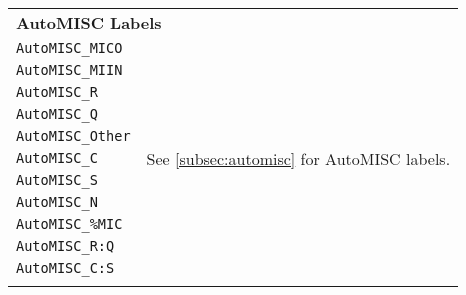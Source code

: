 \begin{longtable}{l p{10cm}}
	\multicolumn{2}{l}{\textbf{AutoMISC Labels}}                                                                                                                                        \\
	\texttt{AutoMISC\_MICO}           & \multirow{11}{*}{See \cref{subsec:automisc} for AutoMISC labels.}                                                                               \\
	\texttt{AutoMISC\_MIIN}           &                                                                                                                                                 \\
	\texttt{AutoMISC\_R}              &                                                                                                                                                 \\
	\texttt{AutoMISC\_Q}              &                                                                                                                                                 \\
	\texttt{AutoMISC\_Other}          &                                                                                                                                                 \\
	\texttt{AutoMISC\_C}              &                                                                                                                                                 \\
	\texttt{AutoMISC\_S}              &                                                                                                                                                 \\
	\texttt{AutoMISC\_N}              &                                                                                                                                                 \\
	\texttt{AutoMISC\_\%MIC}          &                                                                                                                                                 \\
	\texttt{AutoMISC\_R:Q}            &                                                                                                                                                 \\
	\texttt{AutoMISC\_C:S}            &                                                                                                                                                 \\





	\label{tab:datadesc}
\end{longtable}




